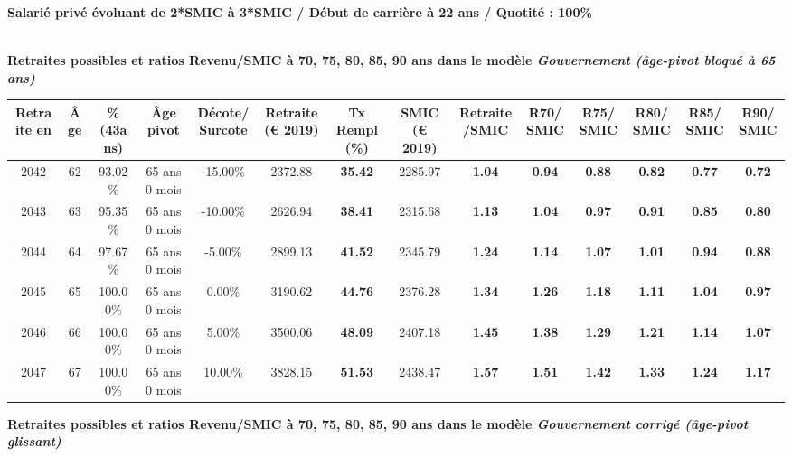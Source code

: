 {\bf \noindent Salarié privé évoluant de 2*SMIC à 3*SMIC / Début de carrière à 22 ans / Quotité : 100\%}  ~ 

 ~\\{\bf \noindent Retraites possibles et ratios Revenu/SMIC à 70, 75, 80, 85, 90 ans dans le modèle \emph{Gouvernement (âge-pivot bloqué à 65 ans)}}  
 
\begin{adjustbox}{max width=\textwidth} 
\begin{tabular}[htb]{|c|c||c|c|c||c|c||c|c||c|c|c|c|c|} 
\hline 
 Retraite en &  Âge &  \%(43ans) &  Âge pivot &  Décote/Surcote &  Retraite (\euro{} 2019) &  Tx Rempl(\%) &  SMIC (\euro{} 2019) &  Retraite/SMIC &  R70/SMIC &  R75/SMIC &  R80/SMIC &  R85/SMIC &  R90/SMIC \\ 
\hline \hline 
 2042 &  62 &  93.02\% &  65 ans 0 mois &  -15.00\% &  2372.88 &  {\bf 35.42} &  2285.97 &  {\bf 1.04} &  {\bf {\color{red} 0.94}} &  {\bf {\color{red} 0.88}} &  {\bf {\color{red} 0.82}} &  {\bf {\color{red} 0.77}} &  {\bf {\color{red} 0.72}} \\ 
\hline 
 2043 &  63 &  95.35\% &  65 ans 0 mois &  -10.00\% &  2626.94 &  {\bf 38.41} &  2315.68 &  {\bf 1.13} &  {\bf 1.04} &  {\bf {\color{red} 0.97}} &  {\bf {\color{red} 0.91}} &  {\bf {\color{red} 0.85}} &  {\bf {\color{red} 0.80}} \\ 
\hline 
 2044 &  64 &  97.67\% &  65 ans 0 mois &  -5.00\% &  2899.13 &  {\bf 41.52} &  2345.79 &  {\bf 1.24} &  {\bf 1.14} &  {\bf 1.07} &  {\bf 1.01} &  {\bf {\color{red} 0.94}} &  {\bf {\color{red} 0.88}} \\ 
\hline 
 2045 &  65 &  100.00\% &  65 ans 0 mois &  0.00\% &  3190.62 &  {\bf 44.76} &  2376.28 &  {\bf 1.34} &  {\bf 1.26} &  {\bf 1.18} &  {\bf 1.11} &  {\bf 1.04} &  {\bf {\color{red} 0.97}} \\ 
\hline 
 2046 &  66 &  100.00\% &  65 ans 0 mois &  5.00\% &  3500.06 &  {\bf 48.09} &  2407.18 &  {\bf 1.45} &  {\bf 1.38} &  {\bf 1.29} &  {\bf 1.21} &  {\bf 1.14} &  {\bf 1.07} \\ 
\hline 
 2047 &  67 &  100.00\% &  65 ans 0 mois &  10.00\% &  3828.15 &  {\bf 51.53} &  2438.47 &  {\bf 1.57} &  {\bf 1.51} &  {\bf 1.42} &  {\bf 1.33} &  {\bf 1.24} &  {\bf 1.17} \\ 
\hline 
\hline 
\end{tabular} 
\end{adjustbox} 
 
 \vspace{0.1cm} 
{\bf \noindent Retraites possibles et ratios Revenu/SMIC à 70, 75, 80, 85, 90 ans dans le modèle \emph{Gouvernement corrigé (âge-pivot glissant)}}  
 
